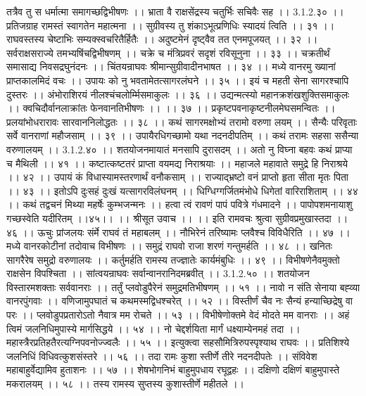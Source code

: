 तत्रैव तु स धर्मात्मा समागच्छद्विभीषणः ।।
भ्राता वै राक्षसेंद्रस्य चतुर्भिः सचिवैः सह ।। 3.1.2.३० ।।
प्रतिजग्राह रामस्तं स्वागतेन महात्मना ।।
सुग्रीवस्य तु शंकाऽभूत्प्रणिधिः स्यादयं त्विति ।। ३१ ।।
राघवस्तस्य चेष्टाभिः सम्यक्स्वचरितैर्हितैः ।।
अदुष्टमेनं दृष्ट्वैव तत एनमपूजयत् ।। ३२ ।।
सर्वराक्षसराज्ये तमभ्यषिंचद्विभीषणम् ।।
चक्रे च मंत्रिप्रवरं सदृशं रविसूनुना ।। ३३ ।।
चक्रतीर्थं समासाद्य निवसद्रघुनंदनः ।।
चिंतयन्राघवः श्रीमान्सुग्रीवादीनभाषत ।। ३४ ।।
मध्ये वानरमु ख्यानां प्राप्तकालमिदं वचः ।।
उपायः को नु भवतामेतत्सागरलंघने ।। ३५ ।।
इयं च महती सेना सागरश्चापि दुस्तरः ।।
अंभोराशिरयं नीलश्चंचलोर्म्मिसमाकुलः ।। ३६ ।।
उद्यन्मत्स्यो महानक्रशंखशुक्तिसमाकुलः ।।
क्वचिदौर्वानलाक्रांतः फेनवानतिभीषणः ।। ।। ३७ ।।
प्रकृष्टपवनाकृष्टनीलमेघसमन्वितः ।।
प्रलयांभोधरारावः सारवाननिलोद्धतः ।। ३८ ।।
कथं सागरमक्षोभ्यं तरामो वरुणा लयम् ।।
सैन्यैः परिवृताः सर्वे वानराणां महौजसाम् ।। ३९ ।।
उपायैरधिगच्छामो यथा नदनदीपतिम् ।।
कथं तरामः सहसा ससैन्या वरुणालयम् ।। 3.1.2.४० ।।
शतयोजनमायातं मनसापि दुरासदम् ।।
अतो नु विघ्ना बहवः कथं प्राप्या च मैथिली ।। ४१ ।।
कष्टात्कष्टतरं प्राप्ता वयमद्य निराश्रयाः ।।
महाजले महावाते समुद्रे हि निराश्रये ।। ४२ ।।
उपायं कं विधास्यामस्तरणार्थं वनौकसाम् ।।
राज्याद्भ्रष्टो वनं प्राप्तो हृता सीता मृतः पिता ।। ४३ ।।
इतोऽपि दुःसहं दुःखं यत्सागरविलंघनम् ।।
धिग्धिग्गर्जितमंभोधे धिगेतां वारिराशिताम् ।। ४४ ।।
कथं तद्वचनं मिथ्या महर्षेः कुम्भजन्मनः ।।
हत्वा त्वं रावणं पापं पवित्रे गंधमादने ।।
पापोपशमनायाशु गच्छस्वेति यदीरितम् ।।४५।।
।। श्रीसूत उवाच ।। ।।
इति रामवचः श्रुत्वा सुग्रीवप्रमुखास्तदा ।। ४६ ।।
ऊचुः प्रांजलयः संर्मे राघवं तं महाबलम् ।।
नौभिरेनं तरिष्यामः प्लवैश्च विविधैरिति ।। ४७ ।।
मध्ये वानरकोटीनां तदोवाच विभीषणः ।।
समुद्रं राघवो राजा शरणं गन्तुमर्हति ।। ४८ ।।
खनितः सागरैरेष समुद्रो वरुणालयः ।।
कर्तुमर्हति रामस्य तज्ज्ञातेः कार्यमंबुधिः ।। ४९ ।।
विभीषणेनैवमुक्तो राक्षसेन विपश्चिता ।।
सांत्वयन्राघवः सर्वान्वानरानिदमब्रवीत् ।। 3.1.2.५० ।।
शतयोजन विस्तारमशक्ताः सर्ववानराः ।।
तर्तुं प्लवोडुपैरेनं समुद्रमतिभीषणम् ।। ५१ ।।
नावो न संति सेनाया बह्व्या वानरपुंगवाः ।।
वणिजामुपघातं च कथमस्मद्विधश्चरेत् ।। ५२ ।।
विस्तीर्णं चैव नः सैन्यं हन्याच्छिद्रेषु वा परः ।।
प्लवोडुपप्रतारोऽतो नैवात्र मम रोचते ।। ५३ ।।
विभीषेणोक्तमे वेदं मोदते मम वानराः ।।
अहं त्विमं जलनिधिमुपास्ये मार्गसिद्धये ।। ५४ ।।
नो चेद्दर्शयिता मार्गं धक्ष्याम्येनमहं तदा ।।
महास्त्रैरप्रतिहतैरत्यग्निपवनोज्ज्वलैः ।। ५५ ।।
इत्युक्त्वा सहसौमित्रिरुपस्पृश्याथ राघवः ।।
प्रतिशिश्ये जलनिधिं विधिवत्कुशसंस्तरे ।। ५६ ।।
तदा रामः कुशा स्तीर्णे तीरे नदनदीपतेः ।।
संविवेश महाबाहुर्वेद्यामिव हुताशनः ।। ५७ ।।
शेषभोगनिभं बाहुमुपधाय रघूद्वहः ।।
दक्षिणो दक्षिणं बाहुमुपास्ते मकरालयम् ।। ५८ ।।
तस्य रामस्य सुप्तस्य कुशास्तीर्णे महीतले ।।

